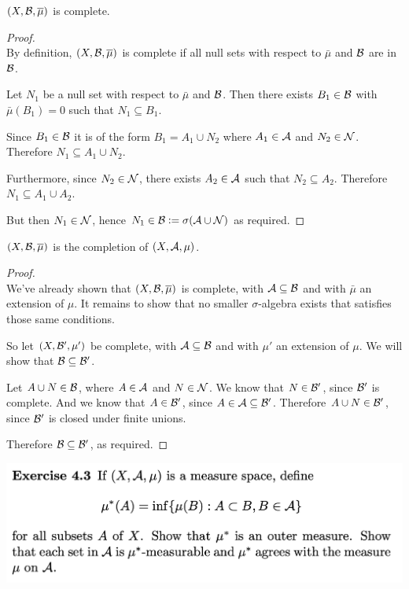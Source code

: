\begin{claim*}
  $(X, \mathcal B, \overline{\mu})$ is complete.
\end{claim*}

\begin{proof}~\\
  By definition, $(X, \mathcal B, \overline{\mu})$ is complete if all null sets with respect to $\bar\mu$ and $\mathcal B$ are
  in $\mathcal B$.

  Let $N_1$ be a null set with respect to $\bar\mu$ and $\mathcal B$. Then there exists $B_1 \in \mathcal B$
  with $\bar\mu(B_1) = 0$ such that $N_1 \subseteq B_1$.

  Since $B_1 \in \mathcal B$ it is of the form $B_1 = A_1 \cup N_2$ where $A_1 \in \mathcal A$ and $N_2 \in \mathcal N$. Therefore
  $N_1 \subseteq A_1 \cup N_2$.

  Furthermore, since $N_2 \in \mathcal N$, there exists $A_2 \in \mathcal A$ such that $N_2 \subseteq A_2$.
  Therefore $N_1 \subseteq A_1 \cup A_2$.

  But then $N_1 \in \mathcal N$, hence $N_1 \in \mathcal B := \sigma(\mathcal A \cup \mathcal N)$ as required.
\end{proof}

\begin{claim*}
  $(X, \mathcal B, \overline{\mu})$ is the completion of $(X, \mathcal A, \mu)$.
\end{claim*}

\begin{proof}~\\
  We've already shown that $(X, \mathcal B, \overline\mu)$ is complete, with $\mathcal A \subseteq \mathcal B$ and with $\bar{\mu}$
  an extension of $\mu$. It remains to show that no smaller $\sigma$-algebra exists that satisfies those same
  conditions.

  So let $(X, \mathcal B', \mu')$ be complete, with $\mathcal A \subseteq \mathcal B$ and with $\mu'$ an extension of $\mu$.
  We will show that $\mathcal B \subseteq \mathcal B'$.

  Let $A \cup N \in \mathcal B$, where $A \in \mathcal A$ and $N \in \mathcal N$. We know that $N \in \mathcal B'$, since $\mathcal B'$
  is complete. And we know that $A \in \mathcal B'$, since $A \in \mathcal A \subseteq \mathcal B'$.
  Therefore $A \cup N \in \mathcal B'$, since $\mathcal B'$ is closed under finite unions.

  Therefore $\mathcal B \subseteq \mathcal B'$, as required.
\end{proof}

\newpage
\begin{mdframed}
  \includegraphics[width=400pt]{img/analysis--berkeley-202a-hw-0d98.png}
\end{mdframed}

